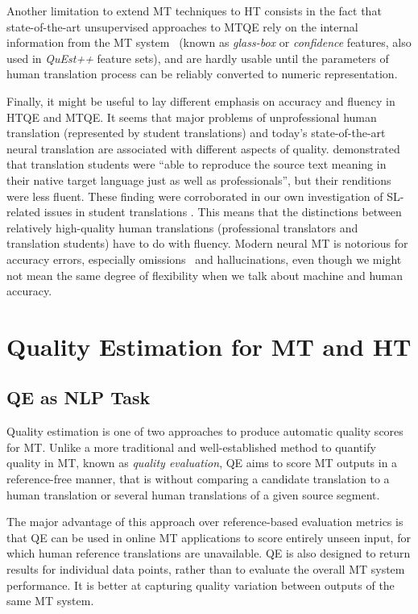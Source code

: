 Another limitation to extend MT techniques to HT consists in the fact that state-of-the-art unsupervised approaches to \gls{MTQE} rely on the internal information from the MT system~\cite{Fomicheva2020} (known as \textit{glass-box} or \textit{confidence} features, also used in \textit{QuEst++} feature sets), and are hardly usable until the parameters of human translation process can be reliably converted to numeric representation.

Finally, it might be useful to lay different emphasis on accuracy and fluency in HTQE and MTQE. It seems that major problems of unprofessional human translation (represented by student translations) and today's state-of-the-art neural translation are associated with different aspects of quality. \cite{Carl2010} demonstrated that translation students were ``able to reproduce the source text meaning in their native target language just as well as professionals'', but their renditions were less fluent. These finding were corroborated in our own investigation of SL-related issues in student translations \cite{Kunilovskaya2022err}. This means that the distinctions between relatively high-quality human translations (professional translators and translation students) have to do with fluency. 
Modern neural MT is notorious for accuracy errors, especially omissions~\cite[see, for example,][]{vanBrussel2018} and hallucinations, even though we might not mean the same degree of flexibility when we talk about machine and human accuracy.

\section{\label{sec:qe}Quality Estimation for MT and HT}
\subsection{\label{ssec:task}QE as NLP Task}
Quality estimation is one of two approaches to produce automatic quality scores for MT.
Unlike a more traditional and well-established method to quantify quality in MT, known as \textit{quality evaluation}, \gls{QE} aims to score MT outputs in a reference-free manner, that is without comparing a candidate translation to a human translation or several human translations of a given source segment. 

The major advantage of this approach over reference-based evaluation metrics is that QE can be used in online MT applications to score entirely unseen input, for which human reference translations are unavailable. QE is also designed to return results for individual data points, rather than to evaluate the overall MT system performance. It is better at capturing quality variation between outputs of the same MT system. 

